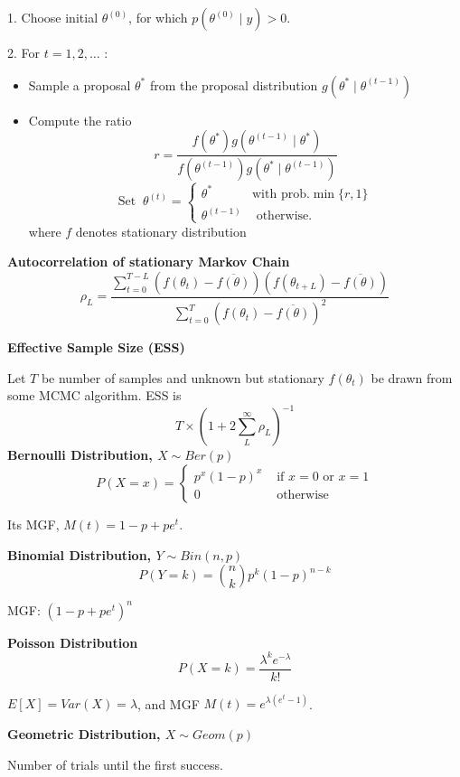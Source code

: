 \documentclass[a4paper]{article}
\newcommand{\subheading}[1]{{\scriptsize\textbf{#1}}}
\begin{document}
\begin{multicols*}{4}
1. Choose initial $\theta^{(0)}$, for which $p\left(\theta^{(0)} \mid y\right)>0$.

2. For $t=1,2, \ldots$ :
    \begin{itemize}
        \item Sample a proposal $\theta^*$ from the proposal distribution $g\left(\theta^* \mid \theta^{(t-1)}\right)$
        \item Compute the ratio $$r=\frac{f\left(\theta^*\right) g\left(\theta^{(t-1)} \mid \theta^*\right)}{f\left(\theta^{(t-1)}\right) g\left(\theta^* \mid \theta^{(t-1)}\right)}$$
        $$
        \text{Set}\;\;  \theta^{(t)}= \begin{cases}\theta^* & \text {with prob.}\min \{r, 1\} \\ \theta^{(t-1)} & \text { otherwise. }\end{cases}
        $$
        where $f$ denotes stationary distribution
    \end{itemize}

\smallskip
\subheading{Autocorrelation of stationary Markov Chain}
$$
\rho_L = \frac{\sum_{t=0}^{T-L} (f(\theta_t)-\overline{f(\theta)}) (f(\theta_{t+L})-\overline{f(\theta)})}{\sum_{t=0}^{T} (f(\theta_t)-\overline{f(\theta)})^2}
$$

\subheading{Effective Sample Size (ESS)}

Let $T$ be number of samples and unknown but stationary $f(\theta_t)$ be drawn from some MCMC algorithm. ESS is
$$
T \times(1 + 2 \sum_{L}^\infty \rho_L)^{-1}
$$
\smallskip
\hline
\smallskip
\subheading{Bernoulli Distribution, $X \sim Ber(p)$}
$$P(X = x) = \begin{cases}
  p^x(1-p)^x & \text{ if $x = 0$ or $x = 1$} \\
  0   & \text{ otherwise}
\end{cases}$$

Its MGF, $M(t) = 1-p + pe^t$.\smallskip

\subheading{Binomial Distribution, $Y \sim Bin(n,p)$ }
$$P(Y=k) = \binom{n}{k}p^k(1-p)^{n-k}$$

MGF: $(1-p+pe^t)^n$
\smallskip

\subheading{Poisson Distribution}
$$P(X=k) = \frac{\lambda^k e^{-\lambda}}{k!}$$

$E[X] = Var(X) = \lambda$, and MGF $M(t) = e^{\lambda(e^t-1)}$. \smallskip

\subheading{Geometric Distribution, $X \sim Geom(p)$}

Number of trials until the first success.


\end{multicols*}
\end{document}
